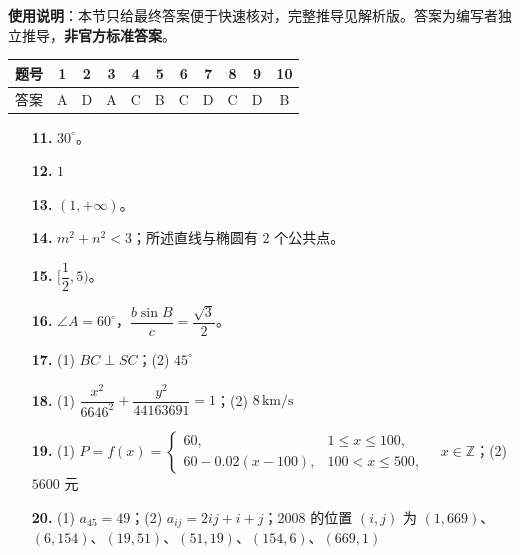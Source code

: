 
\begin{gknotice}
\textbf{使用说明}：本节只给最终答案便于快速核对，完整推导见解析版。答案为编写者独立推导，\textbf{非官方标准答案}。
\end{gknotice}

\begin{center}\begin{tabular}{ccccccccccc}
\toprule
题号 & 1 & 2 & 3 & 4 & 5 & 6 & 7 & 8 & 9 & 10 \\
\midrule
答案 & A & D & A & C & B & C & D & C & D & B \\
\bottomrule
\end{tabular}\end{center}

\begin{itemize}[leftmargin=2.6em]
  \item[\textbf{11.}] $30^\circ$。
  \item[\textbf{12.}] $1$
  \item[\textbf{13.}] $(1,+\infty)$。
  \item[\textbf{14.}] $m^2+n^2<3$；所述直线与椭圆有 $2$ 个公共点。
\end{itemize}

\begin{itemize}[leftmargin=2.6em]
  \item[\textbf{15.}] $[\dfrac12,5)$。
  \item[\textbf{16.}] $\angle A=60^\circ$，$\dfrac{b\sin B}{c}=\dfrac{\sqrt3}{2}$。
  \item[\textbf{17.}] (1) $BC\perp SC$；(2) $45^\circ$
  \item[\textbf{18.}] (1) $\dfrac{x^2}{6646^2}+\dfrac{y^2}{44163691}=1$；(2) $8\,\text{km/s}$
  \item[\textbf{19.}] (1) $P=f(x)=\begin{cases}60,&1\le x\le100,\\60-0.02(x-100),&100<x\le500,\end{cases}\quad x\in\mathbb Z$；(2) $5600$ 元
  \item[\textbf{20.}] (1) $a_{45}=49$；(2) $a_{ij}=2ij+i+j$；$2008$ 的位置 $(i,j)$ 为 $(1,669)$、$(6,154)$、$(19,51)$、$(51,19)$、$(154,6)$、$(669,1)$
\end{itemize}
